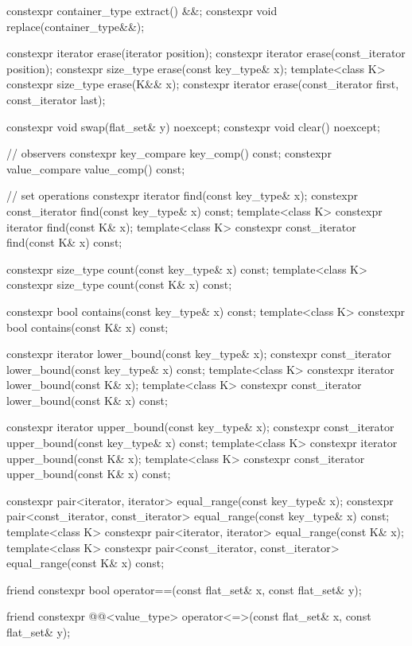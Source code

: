 \begin{codeblock}
{{    constexpr container_type extract() &&;
    constexpr void replace(container_type&&);

    constexpr iterator erase(iterator position);
    constexpr iterator erase(const_iterator position);
    constexpr size_type erase(const key_type& x);
    template<class K> constexpr size_type erase(K&& x);
    constexpr iterator erase(const_iterator first, const_iterator last);

    constexpr void swap(flat_set& y) noexcept;
    constexpr void clear() noexcept;

    // observers
    constexpr key_compare key_comp() const;
    constexpr value_compare value_comp() const;

    // set operations
    constexpr iterator find(const key_type& x);
    constexpr const_iterator find(const key_type& x) const;
    template<class K> constexpr iterator find(const K& x);
    template<class K> constexpr const_iterator find(const K& x) const;

    constexpr size_type count(const key_type& x) const;
    template<class K> constexpr size_type count(const K& x) const;

    constexpr bool contains(const key_type& x) const;
    template<class K> constexpr bool contains(const K& x) const;

    constexpr iterator lower_bound(const key_type& x);
    constexpr const_iterator lower_bound(const key_type& x) const;
    template<class K> constexpr iterator lower_bound(const K& x);
    template<class K> constexpr const_iterator lower_bound(const K& x) const;

    constexpr iterator upper_bound(const key_type& x);
    constexpr const_iterator upper_bound(const key_type& x) const;
    template<class K> constexpr iterator upper_bound(const K& x);
    template<class K> constexpr const_iterator upper_bound(const K& x) const;

    constexpr pair<iterator, iterator> equal_range(const key_type& x);
    constexpr pair<const_iterator, const_iterator> equal_range(const key_type& x) const;
    template<class K>
      constexpr pair<iterator, iterator> equal_range(const K& x);
    template<class K>
      constexpr pair<const_iterator, const_iterator> equal_range(const K& x) const;

    friend constexpr bool operator==(const flat_set& x, const flat_set& y);

    friend constexpr @@<value_type>
      operator<=>(const flat_set& x, const flat_set& y);

}}
\end{codeblock}
